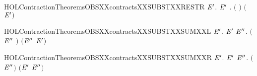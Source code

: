 \begin{SaveVerbatim}{HOLContractionTheoremsOBSXXcontractsXXSUBSTXXRESTR}
\HOLTokenTurnstile{} \HOLSymConst{\HOLTokenForall{}} \ensuremath{\HOLBoundVar{E}\sp{\prime{}}}.
       \ensuremath{\HOLBoundVar{E}\sp{\prime{}}} \HOLSymConst{\HOLTokenImp{}} \HOLSymConst{\HOLTokenForall{}}.  \ensuremath{(}  \ensuremath{)} \ensuremath{(}  \ensuremath{\HOLBoundVar{E}\sp{\prime{}}}\ensuremath{)}
\end{SaveVerbatim}
\newcommand{\HOLContractionTheoremsOBSXXcontractsXXSUBSTXXRESTR}{\UseVerbatim{HOLContractionTheoremsOBSXXcontractsXXSUBSTXXRESTR}}
\begin{SaveVerbatim}{HOLContractionTheoremsOBSXXcontractsXXSUBSTXXSUMXXL}
\HOLTokenTurnstile{} \HOLSymConst{\HOLTokenForall{}} \ensuremath{\HOLBoundVar{E}\sp{\prime{}}}.
       \ensuremath{\HOLBoundVar{E}\sp{\prime{}}} \HOLSymConst{\HOLTokenImp{}}
     \HOLSymConst{\HOLTokenForall{}}\ensuremath{\HOLBoundVar{E}\sp{\prime{}\prime{}}}.  \ensuremath{(}\ensuremath{\HOLBoundVar{E}\sp{\prime{}\prime{}}} \HOLSymConst{\ensuremath{+}} \ensuremath{)} \ensuremath{(}\ensuremath{\HOLBoundVar{E}\sp{\prime{}\prime{}}} \HOLSymConst{\ensuremath{+}} \ensuremath{\HOLBoundVar{E}\sp{\prime{}}}\ensuremath{)}
\end{SaveVerbatim}
\newcommand{\HOLContractionTheoremsOBSXXcontractsXXSUBSTXXSUMXXL}{\UseVerbatim{HOLContractionTheoremsOBSXXcontractsXXSUBSTXXSUMXXL}}
\begin{SaveVerbatim}{HOLContractionTheoremsOBSXXcontractsXXSUBSTXXSUMXXR}
\HOLTokenTurnstile{} \HOLSymConst{\HOLTokenForall{}} \ensuremath{\HOLBoundVar{E}\sp{\prime{}}}.
       \ensuremath{\HOLBoundVar{E}\sp{\prime{}}} \HOLSymConst{\HOLTokenImp{}}
     \HOLSymConst{\HOLTokenForall{}}\ensuremath{\HOLBoundVar{E}\sp{\prime{}\prime{}}}.  \ensuremath{(} \HOLSymConst{\ensuremath{+}} \ensuremath{\HOLBoundVar{E}\sp{\prime{}\prime{}}}\ensuremath{)} \ensuremath{(}\ensuremath{\HOLBoundVar{E}\sp{\prime{}}} \HOLSymConst{\ensuremath{+}} \ensuremath{\HOLBoundVar{E}\sp{\prime{}\prime{}}}\ensuremath{)}
\end{SaveVerbatim}
\newcommand{\HOLContractionTheoremsOBSXXcontractsXXSUBSTXXSUMXXR}{\UseVerbatim{HOLContractionTheoremsOBSXXcontractsXXSUBSTXXSUMXXR}}
